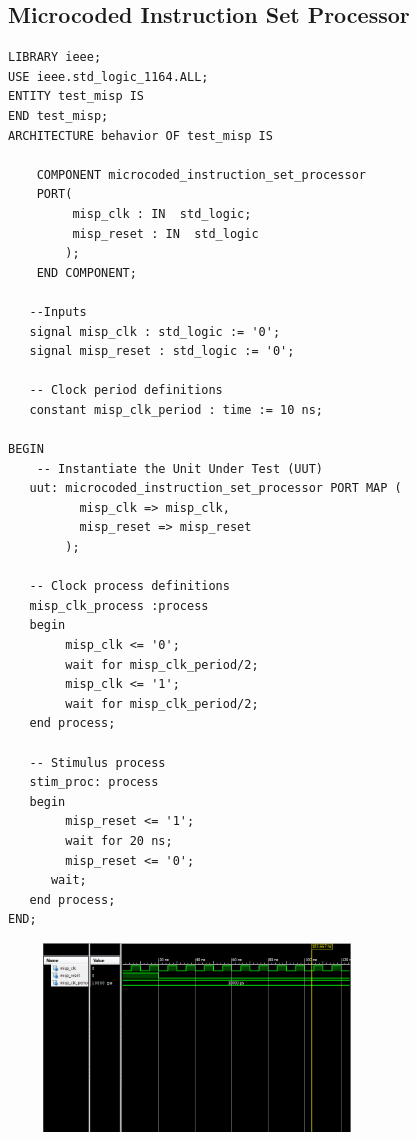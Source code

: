 \documentclass{article}
\begin{document}
\subsection{Microcoded Instruction Set Processor}\label{sec:intro}
\begin{lstlisting}
LIBRARY ieee;
USE ieee.std_logic_1164.ALL; 
ENTITY test_misp IS
END test_misp; 
ARCHITECTURE behavior OF test_misp IS 
 
    COMPONENT microcoded_instruction_set_processor
    PORT(
         misp_clk : IN  std_logic;
         misp_reset : IN  std_logic
        );
    END COMPONENT;
    
   --Inputs
   signal misp_clk : std_logic := '0';
   signal misp_reset : std_logic := '0';

   -- Clock period definitions
   constant misp_clk_period : time := 10 ns;
 
BEGIN
	-- Instantiate the Unit Under Test (UUT)
   uut: microcoded_instruction_set_processor PORT MAP (
          misp_clk => misp_clk,
          misp_reset => misp_reset
        );

   -- Clock process definitions
   misp_clk_process :process
   begin
		misp_clk <= '0';
		wait for misp_clk_period/2;
		misp_clk <= '1';
		wait for misp_clk_period/2;
   end process;
 
   -- Stimulus process
   stim_proc: process
   begin		
		misp_reset <= '1';
		wait for 20 ns;
		misp_reset <= '0';
      wait;
   end process;
END;   
\end{lstlisting}
\includegraphics[width=10cm, height=5cm]{test_misp.png}
\pagebreak
\end{document}
